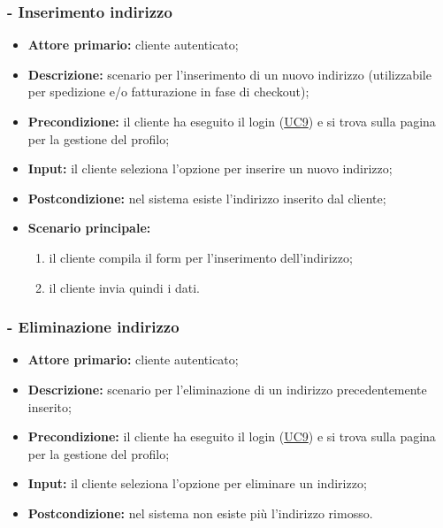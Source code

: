 \subsubsection{ - Inserimento indirizzo}
\begin{itemize}
    \item \textbf{Attore primario:} cliente autenticato;
    \item \textbf{Descrizione:} scenario per l'inserimento di un nuovo indirizzo (utilizzabile per spedizione e/o fatturazione in fase di checkout);
    \item \textbf{Precondizione:} il cliente ha eseguito il login (\hyperref[UC9]{UC9}) e si trova sulla pagina per la gestione del profilo;
    \item \textbf{Input:} il cliente seleziona l'opzione per inserire un nuovo indirizzo;
    \item \textbf{Postcondizione:} nel sistema esiste l'indirizzo inserito dal cliente;
    \item \textbf{Scenario principale:}
          \begin{enumerate}
              \item il cliente compila il form per l'inserimento dell'indirizzo;
              \item il cliente invia quindi i dati.
          \end{enumerate}
\end{itemize}

\stepsubUserCase
\subsubsection{ - Eliminazione indirizzo}
\begin{itemize}
    \item \textbf{Attore primario:} cliente autenticato;
    \item \textbf{Descrizione:} scenario per l'eliminazione di un indirizzo precedentemente inserito;
    \item \textbf{Precondizione:} il cliente ha eseguito il login (\hyperref[UC9]{UC9}) e si trova sulla pagina per la gestione del profilo;
    \item \textbf{Input:} il cliente seleziona l'opzione per eliminare un indirizzo;
    \item \textbf{Postcondizione:} nel sistema non esiste più l'indirizzo rimosso.
\end{itemize}

